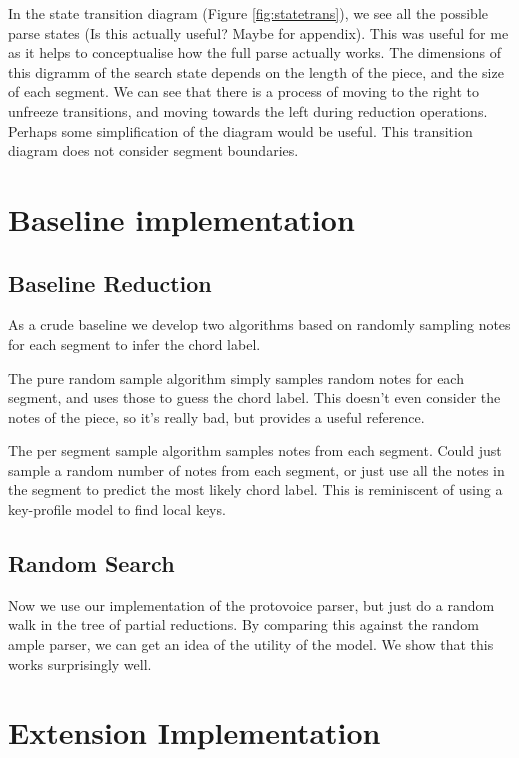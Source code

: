 \documentclass[12pt,a4paper,twoside,openright]{report}
\theoremstyle{definition}
\begin{document}
In the state transition diagram (Figure \ref{fig:statetrans}), we see all the possible parse states (Is this actually useful? Maybe for appendix). This was useful for me as it helps to conceptualise how the full parse actually works. The dimensions of this digramm of the search state depends on the length of the piece, and the size of each segment. We can see that there is a process of moving to the right to unfreeze transitions, and moving towards the left during reduction operations. Perhaps some simplification of the diagram would be useful. This transition diagram does not consider segment boundaries.

\FloatBarrier
\section{Baseline implementation}


\subsection{Baseline Reduction}
As a crude baseline we develop two algorithms based on randomly sampling notes for each segment to infer the chord label. 
\par
The pure random sample algorithm simply samples random notes for each segment, and uses those to guess the chord label. This doesn't even consider the notes of the piece, so it's really bad, but provides a useful reference.
\par 
The per segment sample algorithm samples notes from each segment. Could just sample a random number of notes from each segment, or just use all the notes in the segment to predict the most likely chord label. This is reminiscent of using a key-profile model \cite{temperleyBayesianApproachKeyFinding2002} to find local keys.

\FloatBarrier
\subsection{Random Search}
Now we use our implementation of the protovoice parser, but just do a random walk in the tree of partial reductions. By comparing this against the random ample parser, we can get an idea of the utility of the model. We show that this works surprisingly well.

\FloatBarrier
\section{Extension Implementation}
\end{document}
